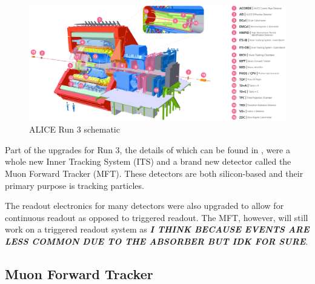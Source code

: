 \begin{figure}[h]
    \begin{center}
        \includegraphics[width=.8\textwidth]{Figs/ALICE_RUN3_schematic.png}
        \caption{ALICE Run 3 schematic}
        \label{fig:ALICE_Schematic}
    \end{center}
\end{figure}

Part of the upgrades for Run 3, the details of which can be found in \cite{ALICE_Upgrade_LOI}, were a whole new Inner Tracking System (ITS) and a brand new detector called the Muon Forward Tracker (MFT). These detectors are both silicon-based and their primary purpose is tracking particles. 

The readout electronics for many detectors were also upgraded to allow for continuous readout as opposed to triggered readout. The MFT, however, will still work on a triggered readout system as \textit{\textbf{I THINK BECAUSE EVENTS ARE LESS COMMON DUE TO THE ABSORBER BUT IDK FOR SURE}}.


\subsection{Muon Forward Tracker}